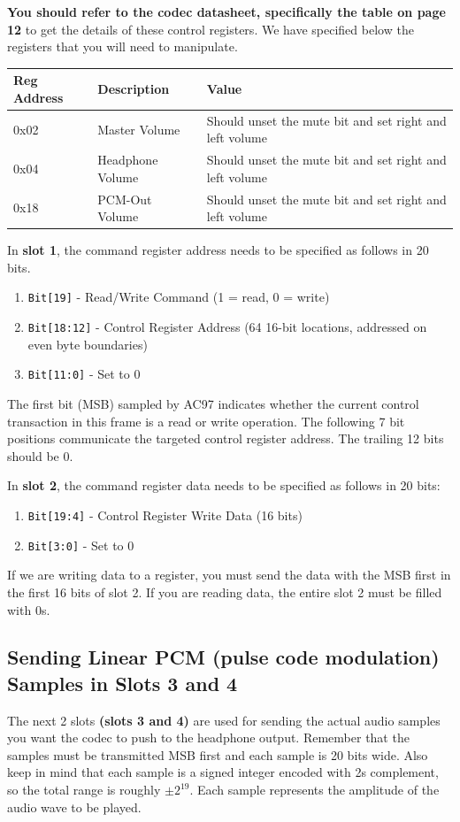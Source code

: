\documentclass[11pt]{article}
\begin{document}
\textbf{You should refer to the codec datasheet, specifically the table on page 12} to get the details of these control registers. We have specified below the registers that you will need to manipulate.

\begin{center}
	\begin{tabular}{ | l | l | p{10cm} |}
		\hline
		\textbf{Reg Address} & \textbf{Description} & \textbf{Value} \\ \hline
		0x02 & Master Volume & Should unset the mute bit and set right and left volume \\ \hline
		0x04 & Headphone Volume & Should unset the mute bit and set right and left volume \\ \hline
		0x18 & PCM-Out Volume & Should unset the mute bit and set right and left volume \\ \hline
	\end{tabular}
\end{center}

In \textbf{slot 1}, the command register address needs to be specified as follows in 20 bits.
\begin{enumerate}
	\item \verb|Bit[19]| - Read/Write Command (1 = read, 0 = write)
	\item \verb|Bit[18:12]| - Control Register Address (64 16-bit locations, addressed on even byte boundaries)
	\item \verb|Bit[11:0]| - Set to 0
\end{enumerate}

The first bit (MSB) sampled by AC97 indicates whether the current control transaction in this frame is a read or write operation. The following 7 bit positions communicate the targeted control register address. The trailing 12 bits should be 0.

In \textbf{slot 2}, the command register data needs to be specified as follows in 20 bits:

\begin{enumerate}
	\item \verb|Bit[19:4]| - Control Register Write Data (16 bits)
	\item \verb|Bit[3:0]| - Set to 0
\end{enumerate}

If we are writing data to a register, you must send the data with the MSB first in the first 16 bits of slot 2. If you are reading data, the entire slot 2 must be filled with 0s.

\subsection{Sending Linear PCM (pulse code modulation) Samples in Slots 3 and 4}
The next 2 slots \textbf{(slots 3 and 4)} are used for sending the actual audio samples you want the codec to push to the headphone output. Remember that the samples must be transmitted MSB first and each sample is 20 bits wide. Also keep in mind that each sample is a signed integer encoded with 2s complement, so the total range is roughly $\pm 2^{19}$. Each sample represents the amplitude of the audio wave to be played.
\end{document}
